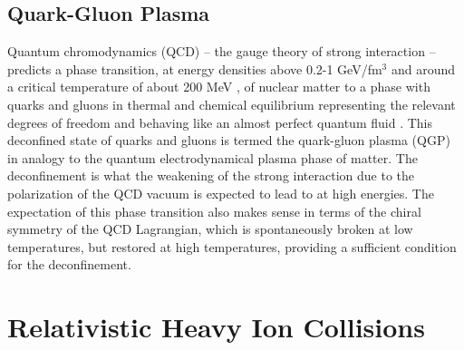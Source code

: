 \subsection{Quark-Gluon Plasma}
Quantum chromodynamics (QCD) -- the gauge theory of strong interaction \cite{KAPUSTA1979461, Shuryak1988} -- predicts a phase transition, at energy densities above 0.2-1 GeV/fm$^{3}$ \cite{Adam:2139456} and around a critical temperature of about 200 MeV \cite{2013arXiv1304.1452M}, of nuclear matter to a phase with quarks and gluons in thermal and chemical equilibrium representing the relevant degrees of freedom and behaving like an almost perfect quantum fluid \cite{PhysRevLett.109.152303}. This deconfined state of quarks and gluons is termed the quark-gluon plasma (QGP) in analogy to the quantum electrodynamical plasma phase of matter. The deconfinement is what the weakening of the strong interaction due to the polarization of the QCD vacuum is expected to lead to at high energies. The expectation of this phase transition also makes sense in terms of the chiral symmetry of the QCD Lagrangian, which is spontaneously broken at low temperatures, but restored at high temperatures, providing a sufficient condition for the deconfinement.

\section{Relativistic Heavy Ion Collisions}


